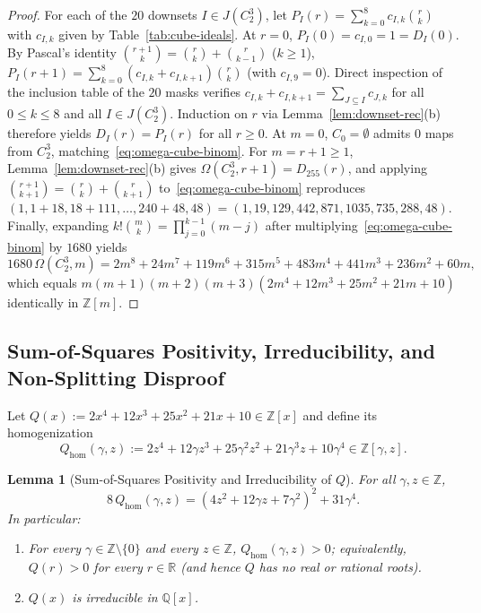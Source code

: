 \documentclass[11pt,a4paper]{article}
\newcommand{\coloneqq}{\mathrel{:=}}
\newtheorem{lemma}[theorem]{Lemma}
\theoremstyle{definition}
\begin{document}
\begin{proof}
For each of the $20$ downsets $I \in J(C_2^3)$, let $P_I(r) = \sum_{k=0}^8 c_{I,k}\binom{r}{k}$ with
$c_{I,k}$ given by Table~\ref{tab:cube-ideals}. At $r = 0$, $P_I(0) = c_{I,0} = 1 = D_I(0)$. By
Pascal's identity $\binom{r+1}{k} = \binom{r}{k} + \binom{r}{k-1}$ ($k \ge 1$), $P_I(r+1) =
\sum_{k=0}^8 (c_{I,k} + c_{I,k+1})\binom{r}{k}$ (with $c_{I,9} = 0$). Direct inspection of the
inclusion table of the $20$ masks verifies $c_{I,k} + c_{I,k+1} = \sum_{J \subseteq I} c_{J,k}$ for
all $0 \le k \le 8$ and all $I \in J(C_2^3)$. Induction on $r$ via Lemma~\ref{lem:downset-rec}(b)
therefore yields $D_I(r) = P_I(r)$ for all $r \ge 0$. At $m = 0$, $C_0 = \emptyset$ admits $0$ maps
from $C_2^3$, matching~\eqref{eq:omega-cube-binom}. For $m = r + 1 \ge 1$, Lemma~\ref{lem:downset-rec}(b)
gives $\Omega(C_2^3, r+1) = D_{255}(r)$, and applying $\binom{r+1}{k+1} = \binom{r}{k} +
\binom{r}{k+1}$ to~\eqref{eq:omega-cube-binom} reproduces $(1, 1+18, 18+111, \dots, 240+48, 48) =
(1, 19, 129, 442, 871, 1035, 735, 288, 48)$. Finally, expanding $k!\binom{m}{k} =
\prod_{j=0}^{k-1}(m-j)$ after multiplying~\eqref{eq:omega-cube-binom} by $1680$ yields
\[
  1680\,\Omega(C_2^3, m)
  = 2m^8 + 24m^7 + 119m^6 + 315m^5 + 483m^4 + 441m^3 + 236m^2 + 60m,
\]
which equals $m(m+1)(m+2)(m+3)(2m^4 + 12m^3 + 25m^2 + 21m + 10)$ identically in $\mathbb{Z}[m]$.
\end{proof}

\subsection{Sum-of-Squares Positivity, Irreducibility, and Non-Splitting Disproof}

Let $Q(x) \coloneqq 2x^4 + 12x^3 + 25x^2 + 21x + 10 \in \mathbb{Z}[x]$ and define its homogenization
\[
  Q_{\mathrm{hom}}(\gamma, z)
  \coloneqq 2z^4 + 12\gamma z^3 + 25\gamma^2 z^2 + 21\gamma^3 z + 10\gamma^4 \in \mathbb{Z}[\gamma, z].
\]

\begin{lemma}[Sum-of-Squares Positivity and Irreducibility of $Q$]\label{lem:quartic-irred}
For all $\gamma, z \in \mathbb{Z}$,
\begin{equation}\label{eq:sos}
  8\,Q_{\mathrm{hom}}(\gamma, z)
  = (4z^2 + 12\gamma z + 7\gamma^2)^2 + 31\gamma^4.
\end{equation}
In particular:
\begin{enumerate}
  \item[(a)] For every $\gamma \in \mathbb{Z} \setminus \{0\}$ and every $z \in \mathbb{Z}$,
        $Q_{\mathrm{hom}}(\gamma, z) > 0$; equivalently, $Q(r) > 0$ for every $r \in \mathbb{R}$
        (and hence $Q$ has no real or rational roots).
  \item[(b)] $Q(x)$ is irreducible in $\mathbb{Q}[x]$.
\end{enumerate}
\end{lemma}
\end{document}
